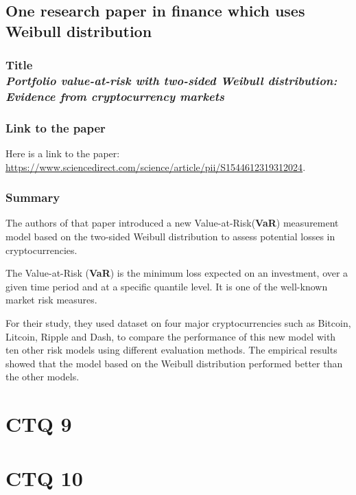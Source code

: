 \documentclass[11pt]{article}
\begin{document}
\subsection{One research paper in finance which uses Weibull distribution}



\subsubsection{{Title} \\  \emph{Portfolio value-at-risk with two-sided Weibull distribution: Evidence from cryptocurrency markets} }


\subsubsection{Link to the paper}


Here is a link to the paper: \href{https://www.sciencedirect.com/science/article/pii/S1544612319312024}{https://www.sciencedirect.com/science/article/pii/S1544612319312024}.




\subsubsection{Summary}

The authors of that paper  introduced a new Value-at-Risk(\textbf{VaR}) measurement model based on the two-sided Weibull distribution to assess potential losses in cryptocurrencies.

The Value-at-Risk (\textbf{VaR}) is the minimum loss expected on an investment, over a given time period and at a specific quantile level. It is one of the well-known market risk measures.

For their study, they used dataset on four major cryptocurrencies such as Bitcoin, Litcoin, Ripple and Dash, to compare the performance of this new model with ten other risk models using different evaluation methods. The empirical results showed that the model based on the  Weibull distribution performed better than the other models.



\newpage
\section{CTQ 9}

\newpage
\section{CTQ 10}

   
\end{document}
